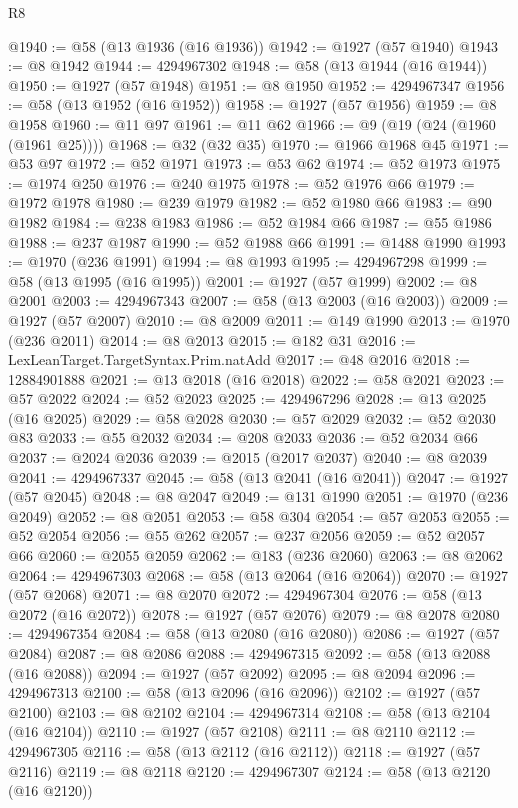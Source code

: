 \begin{lexlean}{R8}
\begin{coremodule}
@1940 := @58 (@13 @1936 (@16 @1936))
@1942 := @1927 (@57 @1940)
@1943 := @8 @1942
@1944 := 4294967302
@1948 := @58 (@13 @1944 (@16 @1944))
@1950 := @1927 (@57 @1948)
@1951 := @8 @1950
@1952 := 4294967347
@1956 := @58 (@13 @1952 (@16 @1952))
@1958 := @1927 (@57 @1956)
@1959 := @8 @1958
@1960 := @11 @97
@1961 := @11 @62
@1966 := @9 (@19 (@24 (@1960 (@1961 @25))))
@1968 := @32 (@32 @35)
@1970 := @1966 @1968 @45
@1971 := @53 @97
@1972 := @52 @1971
@1973 := @53 @62
@1974 := @52 @1973
@1975 := @1974 @250
@1976 := @240 @1975
@1978 := @52 @1976 @66
@1979 := @1972 @1978
@1980 := @239 @1979
@1982 := @52 @1980 @66
@1983 := @90 @1982
@1984 := @238 @1983
@1986 := @52 @1984 @66
@1987 := @55 @1986
@1988 := @237 @1987
@1990 := @52 @1988 @66
@1991 := @1488 @1990
@1993 := @1970 (@236 @1991)
@1994 := @8 @1993
@1995 := 4294967298
@1999 := @58 (@13 @1995 (@16 @1995))
@2001 := @1927 (@57 @1999)
@2002 := @8 @2001
@2003 := 4294967343
@2007 := @58 (@13 @2003 (@16 @2003))
@2009 := @1927 (@57 @2007)
@2010 := @8 @2009
@2011 := @149 @1990
@2013 := @1970 (@236 @2011)
@2014 := @8 @2013
@2015 := @182 @31
@2016 := LexLeanTarget.TargetSyntax.Prim.natAdd
@2017 := @48 @2016
@2018 := 12884901888
@2021 := @13 @2018 (@16 @2018)
@2022 := @58 @2021
@2023 := @57 @2022
@2024 := @52 @2023
@2025 := 4294967296
@2028 := @13 @2025 (@16 @2025)
@2029 := @58 @2028
@2030 := @57 @2029
@2032 := @52 @2030 @83
@2033 := @55 @2032
@2034 := @208 @2033
@2036 := @52 @2034 @66
@2037 := @2024 @2036
@2039 := @2015 (@2017 @2037)
@2040 := @8 @2039
@2041 := 4294967337
@2045 := @58 (@13 @2041 (@16 @2041))
@2047 := @1927 (@57 @2045)
@2048 := @8 @2047
@2049 := @131 @1990
@2051 := @1970 (@236 @2049)
@2052 := @8 @2051
@2053 := @58 @304
@2054 := @57 @2053
@2055 := @52 @2054
@2056 := @55 @262
@2057 := @237 @2056
@2059 := @52 @2057 @66
@2060 := @2055 @2059
@2062 := @183 (@236 @2060)
@2063 := @8 @2062
@2064 := 4294967303
@2068 := @58 (@13 @2064 (@16 @2064))
@2070 := @1927 (@57 @2068)
@2071 := @8 @2070
@2072 := 4294967304
@2076 := @58 (@13 @2072 (@16 @2072))
@2078 := @1927 (@57 @2076)
@2079 := @8 @2078
@2080 := 4294967354
@2084 := @58 (@13 @2080 (@16 @2080))
@2086 := @1927 (@57 @2084)
@2087 := @8 @2086
@2088 := 4294967315
@2092 := @58 (@13 @2088 (@16 @2088))
@2094 := @1927 (@57 @2092)
@2095 := @8 @2094
@2096 := 4294967313
@2100 := @58 (@13 @2096 (@16 @2096))
@2102 := @1927 (@57 @2100)
@2103 := @8 @2102
@2104 := 4294967314
@2108 := @58 (@13 @2104 (@16 @2104))
@2110 := @1927 (@57 @2108)
@2111 := @8 @2110
@2112 := 4294967305
@2116 := @58 (@13 @2112 (@16 @2112))
@2118 := @1927 (@57 @2116)
@2119 := @8 @2118
@2120 := 4294967307
@2124 := @58 (@13 @2120 (@16 @2120))

\end{coremodule}
\end{lexlean}
